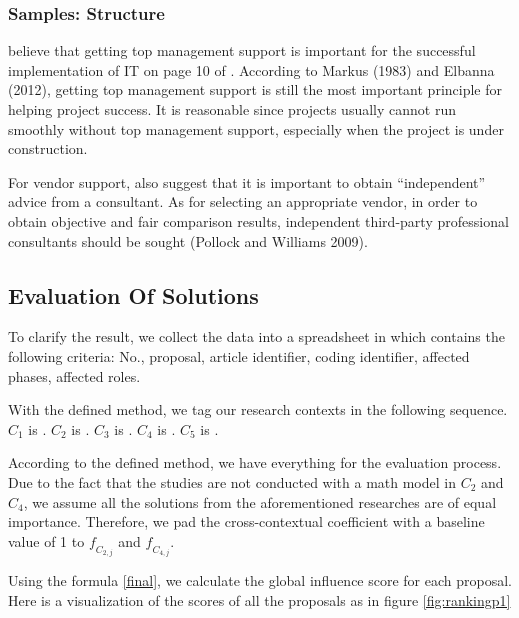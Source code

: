 \subsubsection{Samples: Structure}
\citeauthor{6} believe that getting top management support is important for the successful implementation of IT on page 10 of . According to Markus (1983) and Elbanna (2012), getting top management support is still the most important principle for helping project success. It is reasonable since projects usually cannot run smoothly without top management support, especially when the project is under construction.

For vendor support, \citeauthor{6} also suggest that it is important to obtain “independent” advice from a consultant. As for selecting an appropriate vendor, in order to obtain objective and fair comparison results, independent third-party professional consultants should be sought (Pollock and Williams 2009).

\subsection{Evaluation Of Solutions}
\label{section:evaluation}
To clarify the result, we collect the data into a spreadsheet in which contains the following criteria: No., proposal, article identifier, coding identifier, affected phases, affected roles.

With the defined method, we tag our research contexts in the following sequence.
$C_{1}$ is .
$C_{2}$ is .
$C_{3}$ is .
$C_{4}$ is .
$C_{5}$ is .

According to the defined method, we have everything for the evaluation process. Due to the fact that the studies are not conducted with a math model in $C_{2}$ and $C_{4}$, we assume all the solutions from the aforementioned researches are of equal importance. Therefore, we pad the cross-contextual coefficient with a baseline value of 1 to $\mathit{f_{C_{2,j}}}$ and $\mathit{f_{C_{4,j}}}$.

Using the formula \ref{final}, we calculate the global influence score for each proposal. Here is a visualization of the scores of all the proposals as in figure \ref{fig:rankingp1}

